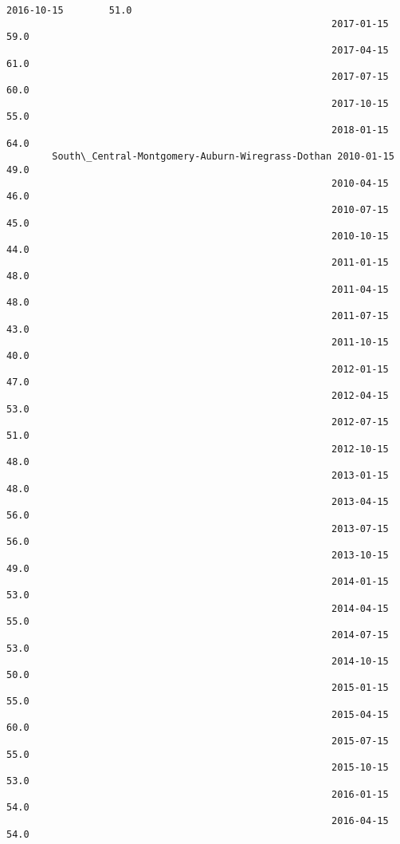 \documentclass[11pt]{article}
\begin{document}
\begin{Verbatim}[commandchars=\\\{\}]
                                                         2016-10-15        51.0   
                                                         2017-01-15        59.0   
                                                         2017-04-15        61.0   
                                                         2017-07-15        60.0   
                                                         2017-10-15        55.0   
                                                         2018-01-15        64.0   
        South\_Central-Montgomery-Auburn-Wiregrass-Dothan 2010-01-15        49.0   
                                                         2010-04-15        46.0   
                                                         2010-07-15        45.0   
                                                         2010-10-15        44.0   
                                                         2011-01-15        48.0   
                                                         2011-04-15        48.0   
                                                         2011-07-15        43.0   
                                                         2011-10-15        40.0   
                                                         2012-01-15        47.0   
                                                         2012-04-15        53.0   
                                                         2012-07-15        51.0   
                                                         2012-10-15        48.0   
                                                         2013-01-15        48.0   
                                                         2013-04-15        56.0   
                                                         2013-07-15        56.0   
                                                         2013-10-15        49.0   
                                                         2014-01-15        53.0   
                                                         2014-04-15        55.0   
                                                         2014-07-15        53.0   
                                                         2014-10-15        50.0   
                                                         2015-01-15        55.0   
                                                         2015-04-15        60.0   
                                                         2015-07-15        55.0   
                                                         2015-10-15        53.0   
                                                         2016-01-15        54.0   
                                                         2016-04-15        54.0   

\end{Verbatim}
\end{document}
